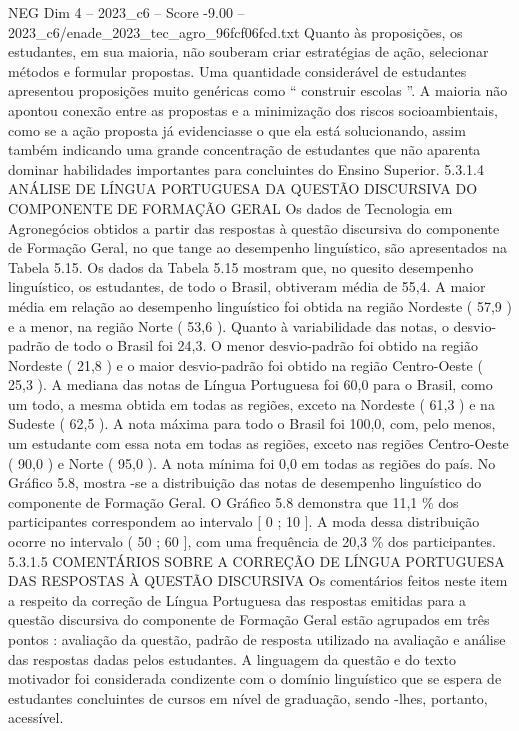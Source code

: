 \begin{textsample}{NEG Dim 4 – 2023\_c6 – Score -9.00 – 2023\_c6/enade\_2023\_tec\_agro\_96fcf06fcd.txt}
Quanto às proposições, os estudantes, em sua maioria, não souberam criar estratégias de ação, selecionar métodos e formular propostas.
Uma quantidade considerável de estudantes apresentou proposições muito genéricas como “ construir escolas ”.
A maioria não apontou conexão entre as propostas e a minimização dos riscos socioambientais, como se a ação proposta já evidenciasse o que ela está solucionando, assim também indicando uma grande concentração de estudantes que não aparenta dominar habilidades importantes para concluintes do Ensino Superior. 5.3.1.4 ANÁLISE DE LÍNGUA PORTUGUESA DA QUESTÃO DISCURSIVA DO COMPONENTE DE FORMAÇÃO GERAL Os dados de Tecnologia em Agronegócios obtidos a partir das respostas à questão discursiva do componente de Formação Geral, no que tange ao desempenho linguístico, são apresentados na Tabela 5.15.
Os dados da Tabela 5.15 mostram que, no quesito desempenho linguístico, os estudantes, de todo o Brasil, obtiveram média de 55,4.
A maior média em relação ao desempenho linguístico foi obtida na região Nordeste ( 57,9 ) e a menor, na região Norte ( 53,6 ).
Quanto à variabilidade das notas, o desvio-padrão de todo o Brasil foi 24,3.
O menor desvio-padrão foi obtido na região Nordeste ( 21,8 ) e o maior desvio-padrão foi obtido na região Centro-Oeste ( 25,3 ).
A mediana das notas de Língua Portuguesa foi 60,0 para o Brasil, como um todo, a mesma obtida em todas as regiões, exceto na Nordeste ( 61,3 ) e na Sudeste ( 62,5 ).
A nota máxima para todo o Brasil foi 100,0, com, pelo menos, um estudante com essa nota em todas as regiões, exceto nas regiões Centro-Oeste ( 90,0 ) e Norte ( 95,0 ).
A nota mínima foi 0,0 em todas as regiões do país.
No Gráfico 5.8, mostra -se a distribuição das notas de desempenho linguístico do componente de Formação Geral.
O Gráfico 5.8 demonstra que 11,1 \% dos participantes correspondem ao intervalo [ 0 ; 10 ].
A moda dessa distribuição ocorre no intervalo ( 50 ; 60 ], com uma frequência de 20,3 \% dos participantes. 5.3.1.5 COMENTÁRIOS SOBRE A CORREÇÃO DE LÍNGUA PORTUGUESA DAS RESPOSTAS À QUESTÃO DISCURSIVA Os comentários feitos neste item a respeito da correção de Língua Portuguesa das respostas emitidas para a questão discursiva do componente de Formação Geral estão agrupados em três pontos : avaliação da questão, padrão de resposta utilizado na avaliação e análise das respostas dadas pelos estudantes.
A linguagem da questão e do texto motivador foi considerada condizente com o domínio linguístico que se espera de estudantes concluintes de cursos em nível de graduação, sendo -lhes, portanto, acessível.

\end{textsample}
